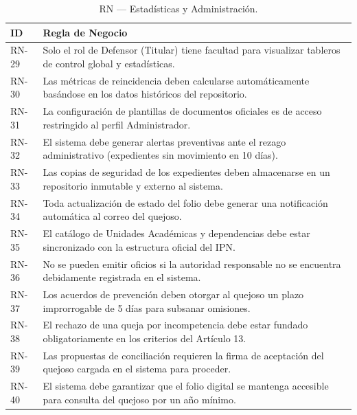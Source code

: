 \documentclass[12pt, oneside, letterpaper]{book}
\begin{document}
\begin{table}[H]
\centering
\caption{RN — Estadísticas y Administración.}
\begin{tabularx}{\textwidth}{@{} l X @{}}
\toprule
\rowcolor[HTML]{2D3E50}
\textbf{\color{white} ID} & \textbf{\color{white} Regla de Negocio} \\ \midrule
\rowcolor[HTML]{F2F4F7}
RN-29 & Solo el rol de Defensor (Titular) tiene facultad para visualizar tableros de control global y estadísticas. \\
RN-30 & Las métricas de reincidencia deben calcularse automáticamente basándose en los datos históricos del repositorio. \\
\rowcolor[HTML]{F2F4F7}
RN-31 & La configuración de plantillas de documentos oficiales es de acceso restringido al perfil Administrador. \\
RN-32 & El sistema debe generar alertas preventivas ante el rezago administrativo (expedientes sin movimiento en 10 días). \\
\rowcolor[HTML]{F2F4F7}
RN-33 & Las copias de seguridad de los expedientes deben almacenarse en un repositorio inmutable y externo al sistema. \\
RN-34 & Toda actualización de estado del folio debe generar una notificación automática al correo del quejoso. \\
\rowcolor[HTML]{F2F4F7}
RN-35 & El catálogo de Unidades Académicas y dependencias debe estar sincronizado con la estructura oficial del IPN. \\
RN-36 & No se pueden emitir oficios si la autoridad responsable no se encuentra debidamente registrada en el sistema. \\
\rowcolor[HTML]{F2F4F7}
RN-37 & Los acuerdos de prevención deben otorgar al quejoso un plazo improrrogable de 5 días para subsanar omisiones. \\
RN-38 & El rechazo de una queja por incompetencia debe estar fundado obligatoriamente en los criterios del Artículo 13. \\
\rowcolor[HTML]{F2F4F7}
RN-39 & Las propuestas de conciliación requieren la firma de aceptación del quejoso cargada en el sistema para proceder. \\
RN-40 & El sistema debe garantizar que el folio digital se mantenga accesible para consulta del quejoso por un año mínimo. \\ \bottomrule
\end{tabularx}
\end{table}
\end{document}

